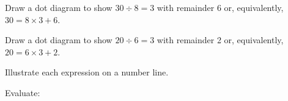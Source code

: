 \begin{exercises}
\begin{questions}
        \Question[2] Draw a dot diagram to show \(30 \div 8=3\) with remainder 6 or, equivalently, \(30=8 \times 3+6\).
            \begin{solutionorbox}[1in]
            \end{solutionorbox}
        \Question[2] Draw a dot diagram to show \(20 \div 6=3\) with remainder 2 or, equivalently, \(20=6 \times 3+2\).
            \begin{solutionorbox}[1in]
            \end{solutionorbox}
        \Question[4] Illustrate each expression on a number line.
        \Question[6] Evaluate:
        \begin{parts}
            \part \[\frac{20}{10}\]
            \begin{solutionordottedlines}[1in]
            \end{solutionordottedlines}
            \part \[\frac{30}{6}\]
            \begin{solutionordottedlines}[1in]
            \end{solutionordottedlines}
            \part \[\frac{42}{7}\]
            \begin{solutionordottedlines}[1in]
            \end{solutionordottedlines}

\end{parts}
\end{questions}
\end{exercises}
